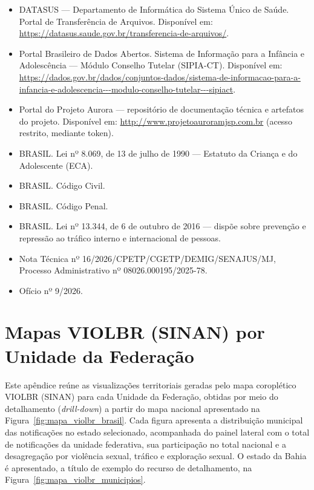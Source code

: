 \documentclass[11pt,a4paper]{article}
\begin{document}
\begin{itemize}
  \item DATASUS — Departamento de Informática do Sistema Único de Saúde. Portal de Transferência de Arquivos. Disponível em: \url{https://datasus.saude.gov.br/transferencia-de-arquivos/}.
  \item Portal Brasileiro de Dados Abertos. Sistema de Informação para a Infância e Adolescência — Módulo Conselho Tutelar (SIPIA-CT). Disponível em: \url{https://dados.gov.br/dados/conjuntos-dados/sistema-de-informacao-para-a-infancia-e-adolescencia---modulo-conselho-tutelar---sipiact}.
  \item Portal do Projeto Aurora — repositório de documentação técnica e artefatos do projeto. Disponível em: \url{http://www.projetoauroramjsp.com.br} (acesso restrito, mediante token).
  \item BRASIL. Lei nº 8.069, de 13 de julho de 1990 — Estatuto da Criança e do Adolescente (ECA).
  \item BRASIL. Código Civil.
  \item BRASIL. Código Penal.
  \item BRASIL. Lei nº 13.344, de 6 de outubro de 2016 — dispõe sobre prevenção e repressão ao tráfico interno e internacional de pessoas.
  \item Nota Técnica nº 16/2026/CPETP/CGETP/DEMIG/SENAJUS/MJ, Processo Administrativo nº 08026.000195/2025-78.
  \item Ofício nº 9/2026.
\end{itemize}

\appendix
\clearpage
\section{Mapas VIOLBR (SINAN) por Unidade da Federação}
\label{ap:sinan_uf}

Este apêndice reúne as visualizações territoriais geradas pelo mapa coroplético VIOLBR (SINAN) para cada Unidade da Federação, obtidas por meio do detalhamento (\emph{drill-down}) a partir do mapa nacional apresentado na Figura~\ref{fig:mapa_violbr_brasil}. Cada figura apresenta a distribuição municipal das notificações no estado selecionado, acompanhada do painel lateral com o total de notificações da unidade federativa, sua participação no total nacional e a desagregação por violência sexual, tráfico e exploração sexual. O estado da Bahia é apresentado, a título de exemplo do recurso de detalhamento, na Figura~\ref{fig:mapa_violbr_municipios}.
\end{document}
